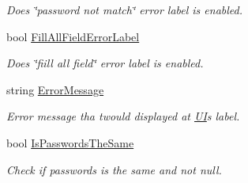 \begin{DoxyCompactItemize}
\begin{DoxyCompactList}\small\item\em Does \char`\"{}password not match\char`\"{} error label is enabled. \end{DoxyCompactList}\item 
bool \mbox{\hyperlink{class_wpf_handler_1_1_u_i_1_1_controls_1_1_logon_1_1_registration_panel_af34f2ada32926ac1f4551b250e7544db}{Fill\+All\+Field\+Error\+Label}}
\begin{DoxyCompactList}\small\item\em Does \char`\"{}fiill all field\char`\"{} error label is enabled. \end{DoxyCompactList}\item 
string \mbox{\hyperlink{class_wpf_handler_1_1_u_i_1_1_controls_1_1_logon_1_1_registration_panel_afaf0825575b64dcf5613320bbf6f5b10}{Error\+Message}}
\begin{DoxyCompactList}\small\item\em Error message tha twould displayed at \mbox{\hyperlink{namespace_wpf_handler_1_1_u_i}{UI}}\textquotesingle{}s label. \end{DoxyCompactList}\item 
bool \mbox{\hyperlink{class_wpf_handler_1_1_u_i_1_1_controls_1_1_logon_1_1_registration_panel_aff8fcb491529663fb55cb90bb1f844d9}{Is\+Passwords\+The\+Same}}
\begin{DoxyCompactList}\small\item\em Check if passwords is the same and not null. \end{DoxyCompactList}\end{DoxyCompactItemize}
